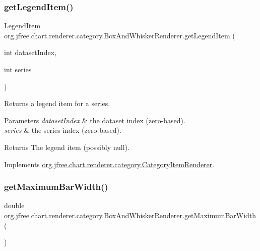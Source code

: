 \subsubsection{\texorpdfstring{get\+Legend\+Item()}{getLegendItem()}}
{\footnotesize\ttfamily \mbox{\hyperlink{classorg_1_1jfree_1_1chart_1_1_legend_item}{Legend\+Item}} org.\+jfree.\+chart.\+renderer.\+category.\+Box\+And\+Whisker\+Renderer.\+get\+Legend\+Item (\begin{DoxyParamCaption}\item[{int}]{dataset\+Index,  }\item[{int}]{series }\end{DoxyParamCaption})}

Returns a legend item for a series.


\begin{DoxyParams}{Parameters}
{\em dataset\+Index} & the dataset index (zero-\/based). \\
\hline
{\em series} & the series index (zero-\/based).\\
\hline
\end{DoxyParams}
\begin{DoxyReturn}{Returns}
The legend item (possibly {\ttfamily null}). 
\end{DoxyReturn}


Implements \mbox{\hyperlink{interfaceorg_1_1jfree_1_1chart_1_1renderer_1_1category_1_1_category_item_renderer_ab9269f34c8b4859211e4f4472636c93c}{org.\+jfree.\+chart.\+renderer.\+category.\+Category\+Item\+Renderer}}.

\mbox{\label{classorg_1_1jfree_1_1chart_1_1renderer_1_1category_1_1_box_and_whisker_renderer_a75dac37a934f1d6fbc517d54b3e6f2ec}} 
\subsubsection{\texorpdfstring{get\+Maximum\+Bar\+Width()}{getMaximumBarWidth()}}
{\footnotesize\ttfamily double org.\+jfree.\+chart.\+renderer.\+category.\+Box\+And\+Whisker\+Renderer.\+get\+Maximum\+Bar\+Width (\begin{DoxyParamCaption}{ }\end{DoxyParamCaption})}

